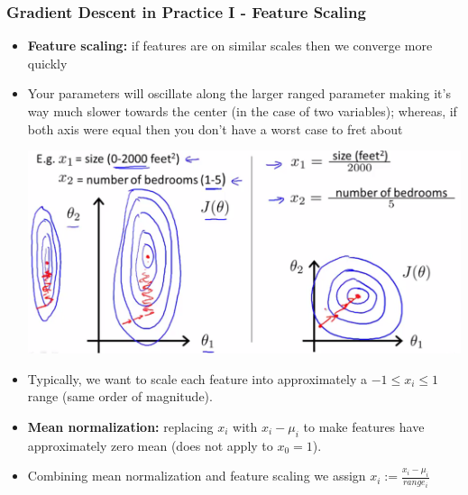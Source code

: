 \subsubsection{Gradient Descent in Practice I - Feature Scaling}
\begin{itemize}[--]
	\item \textbf{Feature scaling:} if features are on similar scales then we converge more quickly
	\item Your parameters will oscillate along the larger ranged parameter making it's way much slower towards the center (in the case of two variables); whereas, if both axis were equal then you don't have a worst case to fret about
	\begin{center}
		\includegraphics[scale=0.25]{sections/cs229/w2/feature_scaling.png}
	\end{center}

	\item Typically, we want to scale each feature into approximately a $-1\leq x_i \leq 1$ range (same order of magnitude).
	\item \textbf{Mean normalization:} replacing $x_i$ with $x_i-\mu_i$ to make features have approximately zero mean (does not apply to $x_0=1$).
	\item Combining mean normalization and feature scaling we assign $x_i := \frac{x_i-\mu_i}{range_i}$

\end{itemize}


